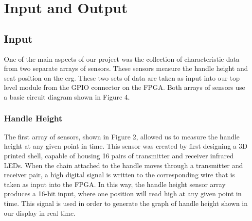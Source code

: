 \documentclass[letterpaper]{article} %
\begin{document}
\section{Input and Output}
\subsection{Input}
One of the main aspects of our project was the collection of characteristic data from two separate arrays of sensors. These sensors measure the handle height and seat position on the erg. These two sets of data are taken as input into our top level module from the GPIO connector on the FPGA. Both arrays of sensors use a basic circuit diagram shown in Figure 4.
\subsubsection{Handle Height}
The first array of sensors, shown in Figure 2, allowed us to measure the handle height at any given point in time. This sensor was created by first designing a 3D printed shell, capable of housing 16 pairs of transmitter and receiver infrared LEDs. When the chain attached to the handle moves through a transmitter and receiver pair, a high digital signal is written to the corresponding wire that is taken as input into the FPGA. In this way, the handle height sensor array produces a 16-bit input, where one position will read high at any given point in time. This signal is used in order to generate the graph of handle height shown in our display in real time.
\end{document}
